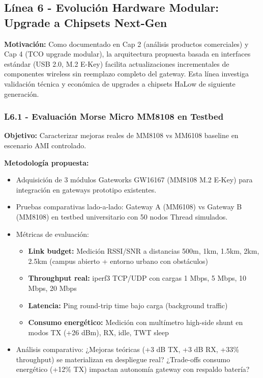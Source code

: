 \subsection{Línea 6 - Evolución Hardware Modular: Upgrade a Chipsets Next-Gen}

\textbf{Motivación:} Como documentado en Cap 2 (análisis productos comerciales) y Cap 4 (TCO upgrade modular), la arquitectura propuesta basada en interfaces estándar (USB 2.0, M.2 E-Key) facilita actualizaciones incrementales de componentes wireless sin reemplazo completo del gateway. Esta línea investiga validación técnica y económica de upgrades a chipsets HaLow de siguiente generación.

\subsubsection{L6.1 - Evaluación Morse Micro MM8108 en Testbed}

\textbf{Objetivo:} Caracterizar mejoras reales de MM8108 vs MM6108 baseline en escenario AMI controlado.

\textbf{Metodología propuesta:}
\begin{itemize}
    \item Adquisición de 3 módulos Gateworks GW16167 (MM8108 M.2 E-Key) para integración en gateways prototipo existentes.
    \item Pruebas comparativas lado-a-lado: Gateway A (MM6108) vs Gateway B (MM8108) en testbed universitario con 50 nodos Thread simulados.
    \item Métricas de evaluación:
    \begin{itemize}
        \item \textbf{Link budget:} Medición RSSI/SNR a distancias 500m, 1km, 1.5km, 2km, 2.5km (campus abierto + entorno urbano con obstáculos)
        \item \textbf{Throughput real:} iperf3 TCP/UDP con cargas 1 Mbps, 5 Mbps, 10 Mbps, 20 Mbps
        \item \textbf{Latencia:} Ping round-trip time bajo carga (background traffic)
        \item \textbf{Consumo energético:} Medición con multímetro high-side shunt en modos TX (+26 dBm), RX, idle, TWT sleep
    \end{itemize}
    \item Análisis comparativo: ¿Mejoras teóricas (+3 dB TX, +3 dB RX, +33\% throughput) se materializan en despliegue real? ¿Trade-offs consumo energético (+12\% TX) impactan autonomía gateway con respaldo batería?
\end{itemize}

